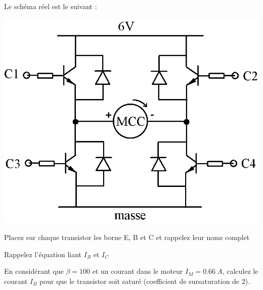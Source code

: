 \documentclass[10pt,fleqn]{article} %
\begin{document}
    Le schéma réel est le suivant :
    \begin{center}
      \includegraphics[height=.23\textheight]{images/Pont_en_H3}
    \end{center}
    \begin{question}
      Placez sur chaque transistor les borne E, B et C et rappelez leur noms complet
    \end{question}
    \begin{question}
      Rappelez l'équation liant $I_B$ et $I_C$
    \end{question}
    \begin{question}
      En considérant que $\beta=100$ et un courant dans le moteur $I_M=\SI{0.66}{A}$, calculez le courant $I_B$ pour que le transistor soit saturé (coefficient de sursaturation de 2).
    \end{question}
\end{document}
